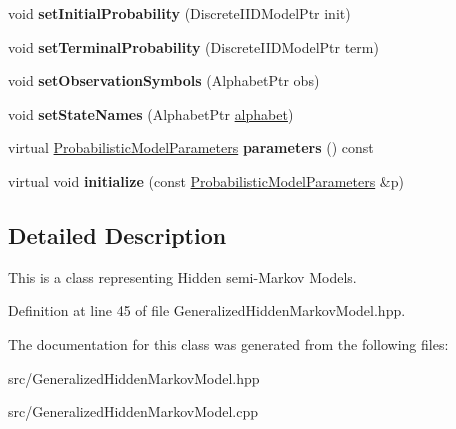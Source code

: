 \begin{DoxyCompactItemize}
\item 
\mbox{\label{classtops_1_1GeneralizedHiddenMarkovModel_aecfcda2c1f5afb0b9b50a489ace2b948}} 
void {\bfseries set\+Initial\+Probability} (Discrete\+I\+I\+D\+Model\+Ptr init)
\item 
\mbox{\label{classtops_1_1GeneralizedHiddenMarkovModel_ad114f6a56a086db6e011ff5704470dcb}} 
void {\bfseries set\+Terminal\+Probability} (Discrete\+I\+I\+D\+Model\+Ptr term)
\item 
\mbox{\label{classtops_1_1GeneralizedHiddenMarkovModel_aa48ddf680a571947310864983dcb0989}} 
void {\bfseries set\+Observation\+Symbols} (Alphabet\+Ptr obs)
\item 
\mbox{\label{classtops_1_1GeneralizedHiddenMarkovModel_aa1c6460cbf00e22b8a1766913b02776a}} 
void {\bfseries set\+State\+Names} (Alphabet\+Ptr \hyperlink{classtops_1_1ProbabilisticModel_acacbfeb9cce968e034b5c18c72f7e217}{alphabet})
\item 
\mbox{\label{classtops_1_1GeneralizedHiddenMarkovModel_adb3a3282849ac5a6fde81323088f61e8}} 
virtual \hyperlink{classtops_1_1ProbabilisticModelParameters}{Probabilistic\+Model\+Parameters} {\bfseries parameters} () const
\item 
\mbox{\label{classtops_1_1GeneralizedHiddenMarkovModel_a167c031b42565089d1e26b829e9d57c8}} 
virtual void {\bfseries initialize} (const \hyperlink{classtops_1_1ProbabilisticModelParameters}{Probabilistic\+Model\+Parameters} \&p)
\end{DoxyCompactItemize}


\subsection{Detailed Description}
This is a class representing Hidden semi-\/\+Markov Models. 

Definition at line 45 of file Generalized\+Hidden\+Markov\+Model.\+hpp.



The documentation for this class was generated from the following files\+:\begin{DoxyCompactItemize}
\item 
src/Generalized\+Hidden\+Markov\+Model.\+hpp\item 
src/Generalized\+Hidden\+Markov\+Model.\+cpp\end{DoxyCompactItemize}
